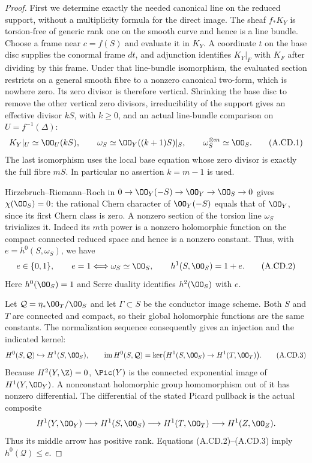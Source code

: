 \begin{proof}
First we determine exactly the needed canonical line on
the reduced support, without a multiplicity formula for
the direct image. The sheaf $f_*K_Y$ is torsion-free of
generic rank one on the smooth curve and hence is a
line bundle. Choose a frame near $c=f(S)$ and evaluate
it in $K_Y$. A coordinate $t$ on the base disc supplies
the conormal frame $dt$, and adjunction identifies
$K_Y|_F$ with $K_F$ after dividing by this frame.
Under that line-bundle isomorphism, the evaluated
section restricts on a general smooth fibre to a
nonzero canonical two-form, which is nowhere zero.
Its zero divisor is therefore
vertical. Shrinking the base disc to remove the other
vertical zero divisors, irreducibility of the support
gives an effective divisor $kS$, with $k\ge0$, and an
actual line-bundle comparison on $U=f^{-1}(\Delta)$:
\[
 K_Y|_U\simeq\OO_U(kS),\qquad
 \omega_S\simeq\OO_Y((k+1)S)|_S,\qquad
 \omega_S^{\otimes m}\simeq\OO_S.                 \tag{A.CD.1}
\]
The last isomorphism uses the local base equation whose
zero divisor is exactly the full fibre $mS$.
In particular no assertion $k=m-1$ is used.

Hirzebruch--Riemann--Roch in
$0\to\OO_Y(-S)\to\OO_Y\to\OO_S\to0$ gives
$\chi(\OO_S)=0$: the rational Chern character of
$\OO_Y(-S)$ equals that of $\OO_Y$, since its first
Chern class is zero. A nonzero section of the torsion
line $\omega_S$ trivializes it. Indeed its $m$th power
is a nonzero holomorphic function on the compact
connected reduced space and hence is a nonzero constant.
Thus, with $e=h^0(S,\omega_S)$, we have
\[
 e\in\{0,1\},\qquad
 e=1\Longleftrightarrow\omega_S\simeq\OO_S,
 \qquad h^1(S,\OO_S)=1+e.                         \tag{A.CD.2}
\]
Here $h^0(\OO_S)=1$ and Serre duality identifies
$h^2(\OO_S)$ with $e$.

Let $\mathcal Q=\eta_*\OO_T/\OO_S$ and let
$\Gamma\subset S$ be the conductor image scheme.
Both $S$ and $T$ are connected and compact, so their
global holomorphic functions are the same constants.
The normalization sequence consequently gives an
injection and the indicated kernel:
\[
 H^0(S,\mathcal Q)\hookrightarrow H^1(S,\OO_S),
 \qquad
 \operatorname{im}H^0(S,\mathcal Q)
 =\ker\bigl(H^1(S,\OO_S)\to H^1(T,\OO_T)\bigr).
                                                               \tag{A.CD.3}
\]
Because $H^2(Y,\Z)=0$, $\Pic(Y)$ is the connected
exponential image of $H^1(Y,\OO_Y)$. A nonconstant
holomorphic group homomorphism out of it has nonzero
differential. The differential of the stated Picard
pullback is the actual composite
\[
 H^1(Y,\OO_Y)\longrightarrow H^1(S,\OO_S)
 \longrightarrow H^1(T,\OO_T)
 \longrightarrow H^1(Z,\OO_Z).
\]
Thus its middle arrow has positive rank. Equations
(A.CD.2)--(A.CD.3) imply $h^0(\mathcal Q)\le e$.


\end{proof}
